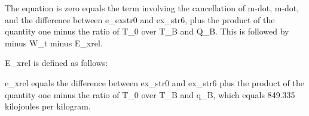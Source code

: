 The equation is zero equals the term involving the cancellation of m-dot, m-dot, and the difference between e_exstr0 and ex_str6, plus the product of the quantity one minus the ratio of T_0 over T_B and Q_B. This is followed by minus W_t minus E_xrel.

E_xrel is defined as follows:

e_xrel equals the difference between ex_str0 and ex_str6 plus the product of the quantity one minus the ratio of T_0 over T_B and q_B, which equals 849.335 kilojoules per kilogram.